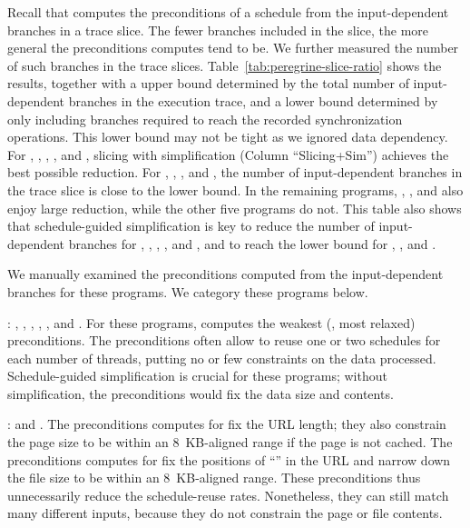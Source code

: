 Recall that \peregrine computes the preconditions of a schedule from
the input-dependent branches in a trace slice.  The
fewer branches included in the slice, the more general the preconditions
\peregrine computes tend to be.  We further measured the number of such
branches in the trace slices.  Table~\ref{tab:peregrine-slice-ratio} shows the
results, together with a upper bound determined by the total number of
input-dependent branches in the execution trace, and a lower bound
determined by only including branches required to reach the recorded
synchronization operations.  This lower bound may not be tight as we ignored data
dependency.  For \barnes, \fft, \blackscholes, \swaptions, and
\streamcluster, slicing with simplification (Column ``Slicing+Sim'')
achieves the best possible reduction.  For \pbzip, \aget, \pfscan, and \luc, the
number of input-dependent branches in the trace slice is close to the
lower bound.  In the remaining programs, \apache, \fmm, and \cholesky
also enjoy large reduction, while the other five programs do not.  This table
also shows that schedule-guided simplification is key to reduce the
number of input-dependent branches for \pbzip, \fft, \luc, \blackscholes, 
and \swaptions,
and to reach the lower bound for \blackscholes, \swaptions, and \streamcluster.


We manually examined the preconditions \peregrine computed from the
input-dependent branches for these programs.  We category these programs
below.

: \pbzip, \fft, \luc, \blackscholes, \swaptions,
  and \streamcluster. For these programs, \peregrine computes the weakest
  (\ie, most relaxed) preconditions. The preconditions often allow \peregrine
  to reuse one or two schedules for each number of threads, putting no
   or few constraints on the data processed.
  Schedule-guided simplification is crucial for
  these programs; without simplification, the preconditions
  would fix the data size and contents.

: \apache and \aget. The
  preconditions \peregrine computes for \apache fix the URL length; they also
  constrain the page size to be within an 8~KB-aligned range if
    the page is not cached.  The preconditions \peregrine computes for \aget fix
    the positions of ``\vv{/}'' in the URL and narrow down the file size
    to be within an 8~KB-aligned range.  These preconditions thus
      unnecessarily reduce the schedule-reuse rates.  Nonetheless, they
      can still match many different inputs, because they do not constrain
      the page or file contents.

